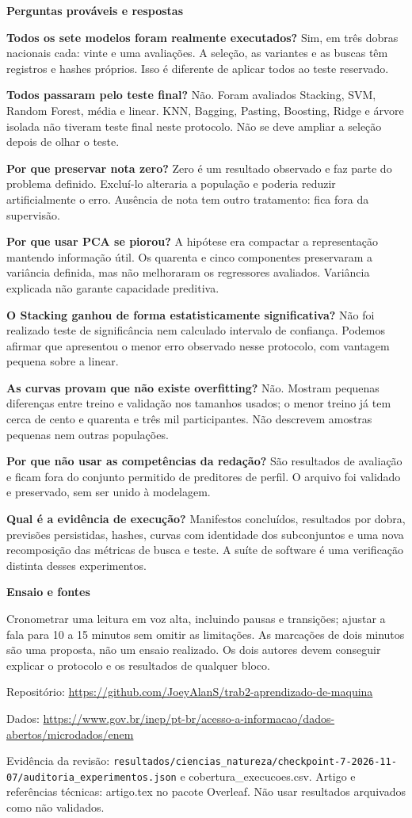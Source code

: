 \documentclass[12pt,a4paper]{article}
\newcommand{\heading}[1]{\par\Needspace{4\baselineskip}\noindent\textbf{#1}\par\vspace{5pt}}
\begin{document}
\heading{Perguntas prováveis e respostas}
\textbf{Todos os sete modelos foram realmente executados?} Sim, em três dobras nacionais cada: vinte e uma avaliações. A seleção, as variantes e as buscas têm registros e hashes próprios. Isso é diferente de aplicar todos ao teste reservado.


\textbf{Todos passaram pelo teste final?} Não. Foram avaliados Stacking, SVM, Random Forest, média e linear. KNN, Bagging, Pasting, Boosting, Ridge e árvore isolada não tiveram teste final neste protocolo. Não se deve ampliar a seleção depois de olhar o teste.


\textbf{Por que preservar nota zero?} Zero é um resultado observado e faz parte do problema definido. Excluí-lo alteraria a população e poderia reduzir artificialmente o erro. Ausência de nota tem outro tratamento: fica fora da supervisão.


\textbf{Por que usar PCA se piorou?} A hipótese era compactar a representação mantendo informação útil. Os quarenta e cinco componentes preservaram a variância definida, mas não melhoraram os regressores avaliados. Variância explicada não garante capacidade preditiva.


\textbf{O Stacking ganhou de forma estatisticamente significativa?} Não foi realizado teste de significância nem calculado intervalo de confiança. Podemos afirmar que apresentou o menor erro observado nesse protocolo, com vantagem pequena sobre a linear.


\textbf{As curvas provam que não existe overfitting?} Não. Mostram pequenas diferenças entre treino e validação nos tamanhos usados; o menor treino já tem cerca de cento e quarenta e três mil participantes. Não descrevem amostras pequenas nem outras populações.


\textbf{Por que não usar as competências da redação?} São resultados de avaliação e ficam fora do conjunto permitido de preditores de perfil. O arquivo foi validado e preservado, sem ser unido à modelagem.


\textbf{Qual é a evidência de execução?} Manifestos concluídos, resultados por dobra, previsões persistidas, hashes, curvas com identidade dos subconjuntos e uma nova recomposição das métricas de busca e teste. A suíte de software é uma verificação distinta desses experimentos.


\heading{Ensaio e fontes}
Cronometrar uma leitura em voz alta, incluindo pausas e transições; ajustar a fala para 10 a 15 minutos sem omitir as limitações. As marcações de dois minutos são uma proposta, não um ensaio realizado. Os dois autores devem conseguir explicar o protocolo e os resultados de qualquer bloco.


Repositório: \url{https://github.com/JoeyAlanS/trab2-aprendizado-de-maquina}


Dados: \url{https://www.gov.br/inep/pt-br/acesso-a-informacao/dados-abertos/microdados/enem}


Evidência da revisão: \nolinkurl{resultados/ciencias_natureza/checkpoint-7-2026-11-07/auditoria_experimentos.json} e cobertura\_execucoes.csv. Artigo e referências técnicas: artigo.tex no pacote Overleaf. Não usar resultados arquivados como não validados.
\end{document}
